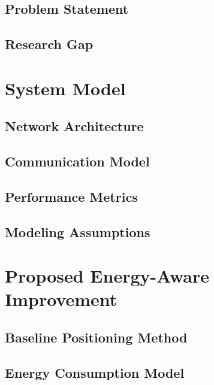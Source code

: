 \documentclass[12pt]{report}
\begin{document}
\section{Problem Statement}

\section{Research Gap}

\chapter{System Model}

\section{Network Architecture}

\section{Communication Model}

\section{Performance Metrics}

\section{Modeling Assumptions}

\chapter{Proposed Energy-Aware Improvement}

\section{Baseline Positioning Method}

\section{Energy Consumption Model}
\end{document}
